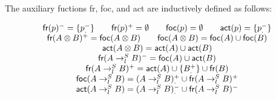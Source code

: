 \begin{definition}
  The auxiliary fuctions \textsf{fr}, \textsf{foc}, and \textsf{act} are
  inductively defined as follows:

  \[
    \begin{array}{c}
      \textsf{fr}(p)^- = \{p_.^-\} \qquad
      \textsf{fr}(p)^+ = \emptyset \qquad
      \textsf{foc}(p) = \emptyset \qquad
      \textsf{act}(p) = \{p_.^-\} \\

      \textsf{fr}(A \otimes B)^+ = \textsf{foc}(A \otimes B) \qquad
      \textsf{foc}(A \otimes B) = \textsf{foc}(A) \cup \textsf{foc}(B) \\

      \textsf{act}(A \otimes B) = \textsf{act}(A) \cup \textsf{act}(B) \\

      \textsf{fr}(A \rightarrow_{l_{}}^S B)^- =
      \textsf{foc}(A) \cup \textsf{act}(B) \\
      \textsf{fr}(A \rightarrow_{l_{}}^S B)^+ =
      \textsf{act}(A) \cup \{ B_.^+ \} \cup \textsf{fr}(B) \\

      \textsf{foc}(A \rightarrow_{l_{}}^S B) =
      (A \rightarrow_{l_{}}^S B)_.^+ \cup
      \textsf{fr}(A \rightarrow_{l_{}}^S B)^+ \\

      \textsf{act}(A \rightarrow_{l_{}}^S B) =
      (A \rightarrow_{l_{}}^S B)_.^- \cup
      \textsf{fr}(A \rightarrow_{l_{}}^S B)^-
    \end{array}
  \]
\end{definition}


